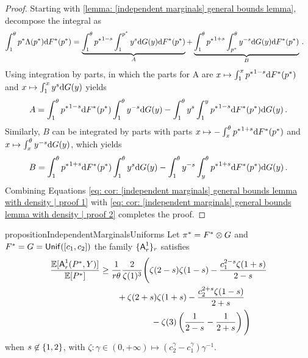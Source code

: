 \begin{proof}
    Starting with \cref{lemma: [independent marginals] general bounds lemma}, decompose the integral as
    \begin{align}
        \int_1^\theta p^*\Lambda(p^*)\mathrm{d}F^*(p^*)&= \underbrace{\int_1^\theta {p^*}^{1-s}\int_1^{p^*}y^{s}\mathrm{d}G(y)\mathrm{d} F^*(p^*)}_{A} + \underbrace{\int_1^\theta {p^*}^{1+s}\int_{p^*}^\theta y^{-s}\mathrm{d}G(y)\mathrm{d}F^*(p^*)}_{B}\,.\notag
    \end{align}
    Using integration by parts, in which the parts for A are $x\mapsto\int_1^{x}{p^*}^{1-s}\mathrm{d}F^*(p^*)$ and $x\mapsto\int_1^{x} y^{s}\mathrm{d} G(y)$ yields
    \begin{align}
        A=\int_1^\theta {p^*}^{1-s}\mathrm{d} F^*(p^*)\int_1^\theta y^{-s}\mathrm{d}G(y) - \int_1^\theta y^{s}\int_1^y {p^*}^{1-s}\mathrm{d} F^*(p^*) \mathrm{d}G(y)\label{eq: cor:  [independent marginals] general bounds lemma with density | proof 1}\,.
    \end{align}
    Similarly, $B$ can be integrated by parts with parts $x\mapsto -\int_x^\theta {p^*}^{1+s}\mathrm{d}F^*(p^*)$ and $x\mapsto \int_x^\theta y^{-s}\mathrm{d}G(y)$, which yields
    \begin{align}
        B= \int_1^\theta {p^*}^{
    1+s}\mathrm{d} F^*(p^*)\int_1^\theta y^{s}\mathrm{d}G(y) - \int_1^\theta y^{-s} \int_y^\theta {p^*}^{1+s}\mathrm{d}F^*(p^*)\mathrm{d}G(y)\label{eq: cor:  [independent marginals] general bounds lemma with density | proof 2}\,.
    \end{align}
    Combining Equations \eqref{eq: cor:  [independent marginals] general bounds lemma with density | proof 1} with \eqref{eq: cor:  [independent marginals] general bounds lemma with density | proof 2} completes the proof.
\end{proof}

\begin{restatable}{proposition}{IndependentMarginalsUniforms}\label{prop: [independent marginals] uniform marginals case}
    Let $\pi^*=F^*\otimes G$ and $F^*=G=\mbox{\textup{\textsf{Unif}}}([c_1,c_2])$ the family $\{\mbox{\textup{\textsf{A}}}^1_r\}_{r}$ satisfies
    \begin{align}
        \frac{\mathbb{E}[\mbox{\textup{\textsf{A}}}^1_r(P^*,Y)]}{\mathbb{E}[P^*]}&\ge \frac{1}{r\theta}\frac{2}{\zeta(1)^3}\Bigg(\zeta(2-s)\zeta(1-s)  - \frac{c_1^{2-s}\zeta(1+s)}{2-s} \notag\\
        &\qquad+ \zeta(2+s)\zeta(1+s)- \frac{c_2^{2+s}\zeta(1-s)}{2+s}\notag\\
        &\hspace{6em}- \zeta(3)\left(\frac1{2-s}-\frac1{2+s}\right)  \Bigg)\notag
    \end{align}
     when $s\not\in\{1,2\}$, with $\zeta:\gamma\in(0,+\infty)\mapsto (c_2^\gamma-c_1^\gamma)\gamma^{-1}$.
\end{restatable}

